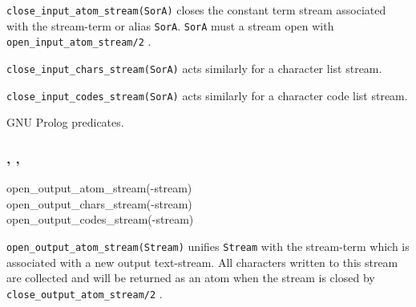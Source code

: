 \Description

\texttt{close\_input\_atom\_stream(SorA)} closes the constant term stream
associated with the stream-term or alias \texttt{SorA}. \texttt{SorA} must a
stream open with \texttt{open\_input\_atom\_stream/2}
.

\texttt{close\_input\_chars\_stream(SorA)} acts similarly for a character
list stream.

\texttt{close\_input\_codes\_stream(SorA)} acts similarly for a character
code list stream.

\begin{PlErrors}






\end{PlErrors}

\Portability

GNU Prolog predicates.

\subsubsection{,\label{open-output-atom-stream/1}
               , \\
               }


\begin{TemplatesOneCol}
open\_output\_atom\_stream(-stream)\\
open\_output\_chars\_stream(-stream)\\
open\_output\_codes\_stream(-stream)

\end{TemplatesOneCol}

\Description

\texttt{open\_output\_atom\_stream(Stream)} unifies \texttt{Stream} with the
stream-term which is associated with a new output text-stream. All characters
written to this stream are collected and will be returned as an atom when
the stream is closed by \texttt{close\_output\_atom\_stream/2}
.

